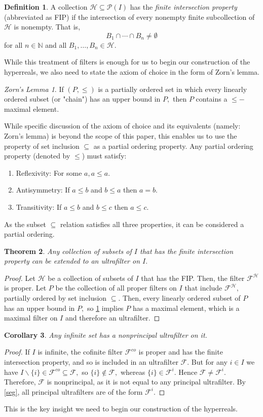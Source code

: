 \documentclass[12pt]{amsart}
\newcommand{\mcF}{\mathcal{F}}
\newcommand{\mcH}{\mathcal{H}}
\theoremstyle{plain}
\newtheorem{thm}{Theorem}
\newtheorem{cor}[thm]{Corollary}
\theoremstyle{definition}
\newtheorem{defn}[thm]{Definition}
\theoremstyle{remark}
\theoremstyle{theorem}
\newtheorem*{axiom}{Zorn's Lemma}
\numberwithin{equation}{section}
\numberwithin{thm}{section}
\begin{document}
\begin{defn}
A collection $\mathcal{H} \subseteq \mathcal{P}(I)$ has the \textit{finite intersection property} (abbreviated as FIP) if the intersection of every nonempty finite subcollection of $\mathcal{H}$ is nonempty. That is,
\[B_1 \cap \cdots \cap B_n \neq \emptyset \]
for all $n \in \mathbb{N}$ and all $B_1, \ldots, B_n \in \mathcal{H}.$ \label{fip}
\end{defn}
While this treatment of filters is enough for us to begin our construction of the hyperreals, we also need to state the axiom of choice in the form of Zorn's lemma.
\begin{axiom}
\label{zorn}
If $(P, \leq)$ is a partially ordered set in which every linearly ordered subset (or "chain") has an upper bound in $P,$ then $P$ contains a $\leq-$maximal element.
\end{axiom}
While specific discussion of the axiom of choice and its equivalents (namely: Zorn's lemma) is beyond the scope of this paper, this enables us to use the property of set inclusion $\subseteq$ as a partial ordering property. Any partial ordering property (denoted by $\leq$) must satisfy:
\begin{enumerate}
    \item Reflexivity: For some $a, a\leq a.$
    \item Antisymmetry: If $a \leq b$ and $b \leq a$ then $a = b.$
    \item Transitivity: If $a \leq b$ and $b \leq c$ then $a \leq c.$
\end{enumerate}
As the subset $\subseteq$ relation satisfies all three properties, it can be considered a partial ordering. 

\begin{thm}
Any collection of subsets of $I$ that has the finite intersection property can be extended to an ultrafilter on $I.$
\end{thm}
\begin{proof}
Let $\mcH$ be a collection of subsets of $I$ that has the FIP. Then, the filter $\mcF^\mcH$ is proper. Let $P$ be the collection of all proper filters on $I$ that include $\mcF^\mcH,$ partially ordered by set inclusion $\subseteq.$ Then, every linearly ordered subset of $P$ has an upper bound in $P,$ so \ref{zorn} implies $P$ has a maximal element, which is a maximal filter on $I$ and therefore an ultrafilter. 
\end{proof}
\begin{cor}
Any infinite set has a nonprincipal ultrafilter on it.
\end{cor}
\begin{proof}
If $I$ is infinite, the cofinite filter $\mcF^{co}$ is proper and has the finite intersection property, and so is included in an ultrafilter $\mcF.$ But for any $i \in I$ we have $I \backslash \{i\} \in \mcF^{co} \subseteq \mcF,$ so $\{i\} \not\in \mcF,$ whereas $\{i\} \in \mcF^{i}.$ Hence $\mcF \neq \mcF^i.$ Therefore, $\mcF$ is nonprincipal, as it is not equal to any principal ultrafilter. By \ref{seg}, all principal ultrafilters are of the form $\mcF^i.$
\end{proof}
This is the key insight we need to begin our construction of the hyperreals.
\end{document}
